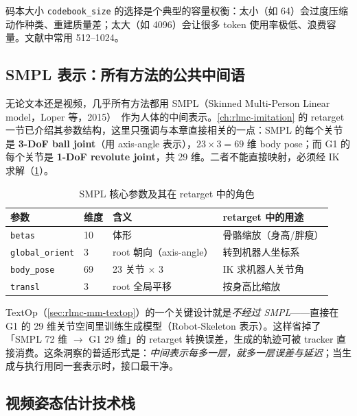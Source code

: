 码本大小 \verb|codebook_size| 的选择是个典型的容量权衡：太小（如 64）会过度压缩动作种类、重建质量差；太大（如 4096）会让很多 token 使用率极低、浪费容量。文献中常用 512--1024。

\subsection{SMPL 表示：所有方法的公共中间语}
\label{sec:rlmc-mm-smpl}

无论文本还是视频，几乎所有方法都用 SMPL（Skinned Multi-Person Linear model，Loper 等，2015）\,\cite{loper2015smpl} 作为人体的中间表示。\cref{ch:rlmc-imitation} 的 retarget 一节已介绍其参数结构，这里只强调与本章直接相关的一点：SMPL 的每个关节是 \textbf{3-DoF ball joint}（用 axis-angle 表示），$23\times 3=69$ 维 body pose；而 G1 的每个关节是 \textbf{1-DoF revolute joint}，共 29 维。二者不能直接映射，必须经 IK 求解（\cref{tab:rlmc-mm-smpl}）。

\begin{table}[ht]
\centering
\small
\caption{SMPL 核心参数及其在 retarget 中的角色}
\label{tab:rlmc-mm-smpl}
\begin{tabular}{@{}llll@{}}
\toprule
参数 & 维度 & 含义 & retarget 中的用途 \\
\midrule
\texttt{betas} & 10 & 体形 & 骨骼缩放（身高/胖瘦） \\
\texttt{global\_orient} & 3 & root 朝向（axis-angle） & 转到机器人坐标系 \\
\texttt{body\_pose} & 69 & 23 关节 $\times$ 3 & IK 求机器人关节角 \\
\texttt{transl} & 3 & root 全局平移 & 按身高比缩放 \\
\bottomrule
\end{tabular}
\end{table}

\begin{insight}\label{ins:rlmc-mm-robotskel}
TextOp（\cref{sec:rlmc-mm-textop}）的一个关键设计就是\emph{不经过 SMPL}——直接在 G1 的 29 维关节空间里训练生成模型（Robot-Skeleton 表示）。这样省掉了「SMPL 72 维 $\to$ G1 29 维」的 retarget 转换误差，生成的轨迹可被 tracker 直接消费。这条洞察的普适形式是：\emph{中间表示每多一层，就多一层误差与延迟}；当生成与执行用同一套表示时，接口最干净。
\end{insight}

\subsection{视频姿态估计技术栈}
\label{sec:rlmc-mm-pose}

